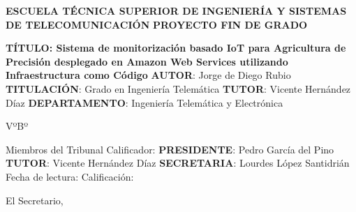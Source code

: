 \documentclass[../../memoria.tex]{subfiles}
\begin{document}
\begin{minipage}[t]{.8\textwidth}
    \bigskip
    \bigskip
    \begin{flushleft}
        \textbf{ESCUELA TÉCNICA SUPERIOR DE INGENIERÍA Y SISTEMAS DE TELECOMUNICACIÓN}
        \bigskip
        \bigskip
        \newline
        \textbf{PROYECTO FIN DE GRADO}
        \bigskip
        \bigskip
        \newline

    \end{flushleft}

    \begin{flushleft}
        \textbf{TÍTULO: Sistema de monitorización basado IoT para Agricultura de Precisión desplegado en Amazon Web Services utilizando Infraestructura como Código}
        \bigskip
        \bigskip
        \bigskip
        \newline
        \textbf{AUTOR}: Jorge de Diego Rubio
        \bigskip
        \newline
        \textbf{TITULACIÓN}:  Grado en Ingeniería Telemática
        \bigskip
        \newline
        \bigskip
        \newline
        \textbf{TUTOR}: Vicente Hernández Díaz
        \bigskip
        \newline
        \textbf{DEPARTAMENTO}: Ingeniería Telemática y Electrónica
    \end{flushleft}

    \begin{flushright}
        \bigskip
        VºBº
    \end{flushright}

    \begin{flushleft}
        \bigskip
        Miembros del Tribunal Calificador:
        \bigskip
        \bigskip
        \newline
        \textbf{PRESIDENTE}: Pedro García del Pino
        \bigskip
        \newline
        \textbf{TUTOR}: Vicente Hernández Díaz
        \bigskip
        \newline
        \textbf{SECRETARIA}: Lourdes López Santidrián
        \bigskip
        \bigskip
        \bigskip
        \newline
        Fecha de lectura:
        \bigskip
        \bigskip
        \bigskip
        \newline
        Calificación:
    \end{flushleft}

    \begin{flushright}
        \bigskip
        \bigskip
        El Secretario,
    \end{flushright}

\end{minipage}%
\end{document}
